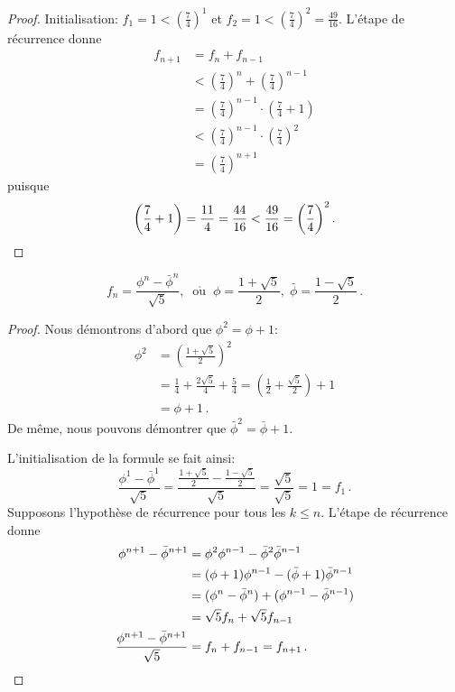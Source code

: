 \begin{proof}
Initialisation: $f_1=1<\left(\displaystyle\frac{7}{4}\right)^1$ et $f_2=1<\left(\displaystyle\frac{7}{4}\right)^2=\displaystyle\frac{49}{16}$. L'étape de récurrence donne 
\begin{align*}
f_{n+1}&=f_n+f_{n-1}\\
&<\left(\frac{7}{4}\right)^n + \left(\frac{7}{4}\right)^{n-1}\\
&=\left(\frac{7}{4}\right)^{n-1}\cdot\left(\frac{7}{4}+1\right)\\
&<\left(\frac{7}{4}\right)^{n-1}\cdot\left(\frac{7}{4}\right)^2\\
&=\left(\frac{7}{4}\right)^{n+1}
\end{align*}
puisque
\[
\left(\frac{7}{4}+1\right) = \frac{11}{4} = \frac{44}{16}<\frac{49}{16}=\left(\frac{7}{4}\right)^2.
\qedhere\]
\end{proof}


\begin{theorem}

\begin{displaymath}
f_n = \frac{\phi^n - \bar{\phi}^n}{\sqrt{5}}, \;\; \mathrm{o\grave{u}} \;\;
\phi = \frac{1+\sqrt{5}}{2},\;\bar{\phi} = \frac{1-\sqrt{5}}{2}\,.
\end{displaymath}
\end{theorem}

\begin{proof}
Nous démontrons d'abord que $\phi^2=\phi+1$:
\begin{align*}
\phi^2 &= \left(\frac{1+\sqrt{5}}{2}\right)^2\\
&= \frac{1}{4} + \frac{2\sqrt{5}}{4} + \frac{5}{4}= \left(\frac{1}{2} + \frac{\sqrt{5}}{2}\right) + 1\\
&=\phi + 1\,.
\end{align*}
De même, nous pouvons démontrer que $\bar{\phi}^2=\bar{\phi}+1$.

L'initialisation de la formule se fait ainsi:
\[
\frac{\phi^1 - \bar{\phi}^1}{\sqrt{5}}=\frac{\frac{1+\sqrt{5}}{2}-\frac{1-\sqrt{5}}{2}}{\sqrt{5}}=\frac{\sqrt{5}}{\sqrt{5}}=1=f_1\,.
\]
Supposons l'hypothèse de récurrence pour tous les $k\leq n$. L'étape de récurrence donne
\begin{align*}
\phi^{n+1} - \bar{\phi}^{n+1} &= \phi^2\phi^{n-1} - \bar{\phi}^2\bar{\phi}^{n-1}\\
&=(\phi+1)\phi^{n-1} - (\bar{\phi}+1)\bar{\phi}^{n-1}\\
&=(\phi^{n} - \bar{\phi}^{n}) + (\phi^{n-1} - \bar{\phi}^{n-1})\\
&=\sqrt{5}f_{n} + \sqrt{5}f_{n-1}\\
\frac{\phi^{n+1} - \bar{\phi}^{n+1}}{\sqrt{5}} &= f_{n} + f_{n-1} = f_{n+1}\,.\qedhere
\end{align*}
\end{proof}

